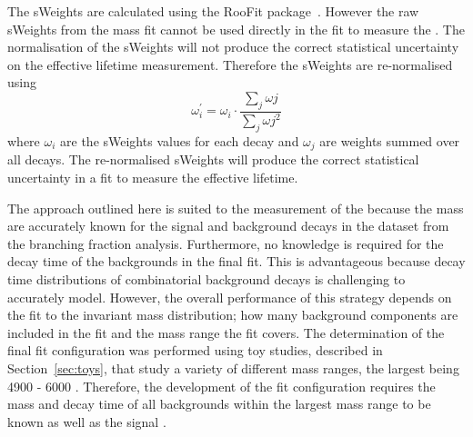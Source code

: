 The sWeights are calculated using the RooFit package~\cite{Verkerke:2003ir}. However the raw sWeights from the mass fit cannot be used directly in the \ml fit to measure the \el. The normalisation of the sWeights will not produce the correct statistical uncertainty on the effective lifetime measurement. Therefore the sWeights are re-normalised using
\begin{equation}
\omega^{'}_{i}= \omega_{i} \cdot \frac{\displaystyle\sum_{j} \omega{j}}{\displaystyle\sum_{j} \omega{j}^{2}}
\label{eq:sWeightsrex}
\end{equation}
where $\omega_{i}$ are the sWeights values for each decay and $\omega_{j}$ are weights summed over all decays. The re-normalised sWeights will produce the correct statistical uncertainty in a \ml fit to measure the \bsmumu effective lifetime.

The approach outlined here is suited to the measurement of the \bsmumu \el because the mass \pdfs are accurately known for the signal and background decays in the dataset from the branching fraction analysis. Furthermore, no knowledge is required for the decay time \pdfs of the backgrounds in the final fit. This is advantageous because decay time distributions of combinatorial background decays is challenging to accurately model. 
However, the overall performance of this strategy depends on the \ml fit to the invariant mass distribution; how many background components are included in the fit and the mass range the fit covers. The determination of the final fit configuration was performed using toy studies, described in Section~\ref{sec:toys}, that study a variety of different mass ranges, the largest being 4900 - 6000 \mevcc. Therefore, the development of the fit configuration requires the mass and decay time \pdfs of all backgrounds within the largest mass range to be known as well as the signal \pdfs. 




